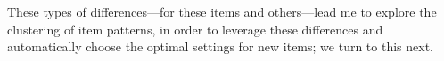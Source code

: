 These types of differences---for these items and others---lead me to explore the clustering of item patterns, in order to
leverage these differences and automatically choose the optimal
settings for new items; we turn to this next.

%
%
%
%
%
%
%
